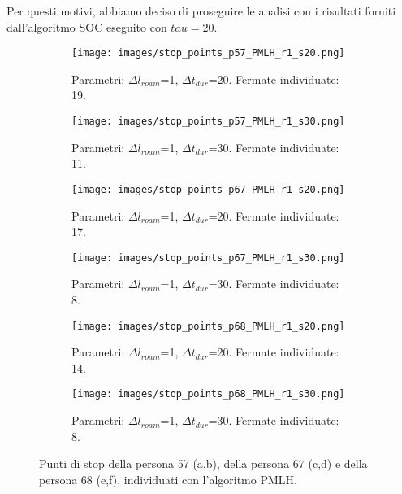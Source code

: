 \documentclass[12pt]{article}
\begin{document}
Per questi motivi, abbiamo deciso di proseguire le analisi con i risultati forniti dall'algoritmo SOC eseguito con $tau=20$.
\begin{figure}[htb!]
    \centering
    \begin{subfigure}[b]{0.45\textwidth}
        \centering
        \texttt{[image: images/stop\_points\_p57\_PMLH\_r1\_s20.png]}
        \caption{Parametri: $\Delta l_{roam}$=1, $\Delta t_{dur}$=20. Fermate individuate: 19.}
        \label{stop_points_p57_PMLH_r1_s20}
    \end{subfigure}
    \hfill
    \begin{subfigure}[b]{0.45\textwidth}
        \centering
        \texttt{[image: images/stop\_points\_p57\_PMLH\_r1\_s30.png]}
        \caption{Parametri: $\Delta l_{roam}$=1, $\Delta t_{dur}$=30. Fermate individuate: 11.}
        \label{stop_points_p57_PMLH_r1_s30}
    \end{subfigure}
    \hfill
    \begin{subfigure}[b]{0.45\textwidth}
        \centering
        \texttt{[image: images/stop\_points\_p67\_PMLH\_r1\_s20.png]}
        \caption{Parametri: $\Delta l_{roam}$=1, $\Delta t_{dur}$=20. Fermate individuate: 17.}
        \label{stop_points_p67_PMLH_r1_s20}
    \end{subfigure}
    \hfill
    \begin{subfigure}[b]{0.45\textwidth}
        \centering
        \texttt{[image: images/stop\_points\_p67\_PMLH\_r1\_s30.png]}
        \caption{Parametri: $\Delta l_{roam}$=1, $\Delta t_{dur}$=30. Fermate individuate: 8.}
        \label{stop_points_p67_PMLH_r1_s30}
    \end{subfigure}
    \hfill
    \begin{subfigure}[b]{0.45\textwidth}
        \centering
        \texttt{[image: images/stop\_points\_p68\_PMLH\_r1\_s20.png]}
        \caption{Parametri: $\Delta l_{roam}$=1, $\Delta t_{dur}$=20. Fermate individuate: 14.}
        \label{stop_points_p68_PMLH_r1_s20}
    \end{subfigure}
    \hfill
    \begin{subfigure}[b]{0.45\textwidth}
        \centering
        \texttt{[image: images/stop\_points\_p68\_PMLH\_r1\_s30.png]}
        \caption{Parametri: $\Delta l_{roam}$=1, $\Delta t_{dur}$=30. Fermate individuate: 8.}
        \label{stop_points_p68_PMLH_r1_s30}
    \end{subfigure}
    \hfill
    \caption{Punti di stop della persona 57 (a,b), della persona 67 (c,d) e della persona 68 (e,f), individuati con l'algoritmo PMLH.}
    \label{stop_points_PMLH}
\end{figure}
\end{document}

